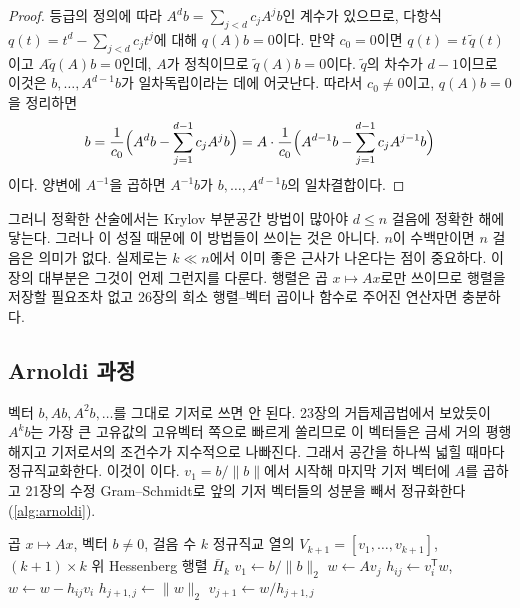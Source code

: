\begin{proof}
등급의 정의에 따라 $A^db=\sum_{j<d}c_jA^jb$인 계수가 있으므로, 다항식 $q(t)=t^d-\sum_{j<d}c_jt^j$에 대해 $q(A)b=0$이다. 만약 $c_0=0$이면 $q(t)=t\,\tilde q(t)$이고 $A\tilde q(A)b=0$인데, $A$가 정칙이므로 $\tilde q(A)b=0$이다. $\tilde q$의 차수가 $d-1$이므로 이것은 $b,\dots,A^{d-1}b$가 일차독립이라는 데에 어긋난다. 따라서 $c_0\ne0$이고, $q(A)b=0$을 정리하면
\[
b=\frac1{c_0}\Bigl(A^db-\sum_{j=1}^{d-1}c_jA^jb\Bigr)=A\cdot\frac1{c_0}\Bigl(A^{d-1}b-\sum_{j=1}^{d-1}c_jA^{j-1}b\Bigr)
\]
이다. 양변에 $A^{-1}$을 곱하면 $A^{-1}b$가 $b,\dots,A^{d-1}b$의 일차결합이다.
\end{proof}

그러니 정확한 산술에서는 Krylov 부분공간 방법이 많아야 $d\le n$ 걸음에 정확한 해에 닿는다. 그러나 이 성질 때문에 이 방법들이 쓰이는 것은 아니다. $n$이 수백만이면 $n$ 걸음은 의미가 없다. 실제로는 $k\ll n$에서 이미 좋은 근사가 나온다는 점이 중요하다. 이 장의 대부분은 그것이 언제 그런지를 다룬다. 행렬은 곱 $x\mapsto Ax$로만 쓰이므로 행렬을 저장할 필요조차 없고 26장의 희소 행렬--벡터 곱이나 함수로 주어진 연산자면 충분하다.

\subsection{Arnoldi 과정}

벡터 $b,Ab,A^2b,\dots$를 그대로 기저로 쓰면 안 된다. 23장의 거듭제곱법에서 보았듯이 $A^kb$는 가장 큰 고유값의 고유벡터 쪽으로 빠르게 쏠리므로 이 벡터들은 금세 거의 평행해지고 기저로서의 조건수가 지수적으로 나빠진다. 그래서 공간을 하나씩 넓힐 때마다 정규직교화한다. 이것이 이다\cite{arnoldi1951}. $v_1=b/\|b\|$에서 시작해 마지막 기저 벡터에 $A$를 곱하고 21장의 수정 Gram--Schmidt로 앞의 기저 벡터들의 성분을 빼서 정규화한다(\cref{alg:arnoldi}).

\begin{algorithm}[t]
\begin{algorithmic}[1]
\Require 곱 $x\mapsto Ax$, 벡터 $b\ne0$, 걸음 수 $k$
\Ensure 정규직교 열의 $V_{k+1}=[v_1,\dots,v_{k+1}]$, $(k+1)\times k$ 위 Hessenberg 행렬 $\bar H_k$
\State $v_1\gets b/\|b\|_2$
  \State $w\gets Av_j$
   
    \State $h_{ij}\gets v_i^{\mathsf T}w$, $w\gets w-h_{ij}v_i$
  \EndFor
  \State $h_{j+1,j}\gets\|w\|_2$
   \Return {}
  \EndIf
  \State $v_{j+1}\gets w/h_{j+1,j}$
\EndFor
\end{algorithmic}
\caption{Arnoldi 과정}
\label{alg:arnoldi}
\end{algorithm}

